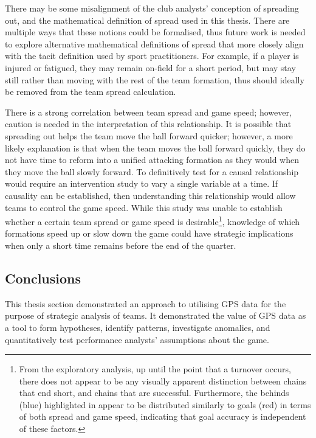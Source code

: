 There may be some misalignment of the club analysts' conception of spreading out, and the mathematical definition of spread used in this thesis. There are multiple ways that these notions could be formalised, thus future work is needed to explore alternative mathematical definitions of spread that more closely align with the tacit definition used by sport practitioners. For example, if a player is injured or fatigued, they may remain on-field for a short period, but may stay still rather than moving with the rest of the team formation, thus should ideally be removed from the team spread calculation.


There is a strong correlation between team spread and game speed; however, caution is needed in the interpretation of this relationship. It is possible that spreading out helps the team move the ball forward quicker; however, a more likely explanation is that when the team moves the ball forward quickly, they do not have time to reform into a unified attacking formation as they would when they move the ball slowly forward. To definitively test for a causal relationship would require an intervention study to vary a single variable at a time. If causality can be established, then understanding this relationship would allow teams to control the game speed. While this study was unable to establish whether a certain team spread or game speed is desirable\footnote{From the exploratory analysis, up until the point that a turnover occurs, there does not appear to be any visually apparent distinction between chains that end short, and chains that are successful. Furthermore, the behinds (blue) highlighted in  appear to be distributed similarly to goals (red) in terms of both spread and game speed, indicating that goal accuracy is independent of these factors.}, knowledge of which formations speed up or slow down the game could have strategic implications when only a short time remains before the end of the quarter.

\subsection{Conclusions}

This thesis section demonstrated an approach to utilising GPS data for the purpose of strategic analysis of \afl{} teams. It demonstrated the value of GPS data as a tool to form hypotheses, identify patterns, investigate anomalies, and quantitatively test performance analysts' assumptions about the game.

